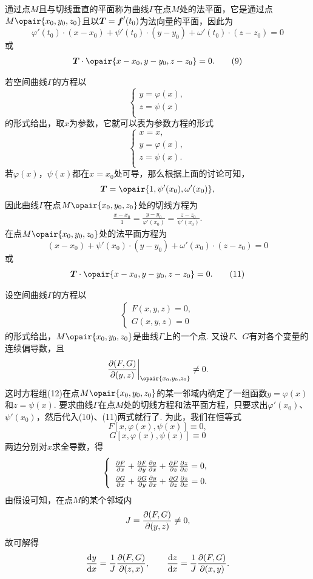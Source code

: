 通过点\(M\)且与切线垂直的平面称为曲线\(\Gamma\)在点\(M\)处的法平面，它是通过点\(M\opair{x_0,y_0,z_0}\)且以\(\boldsymbol{T}=\boldsymbol{f}'(t_0)\)为法向量的平面，因此为\[
\varphi'(t_0) \cdot (x-x_0) + \psi'(t_0) \cdot (y-y_0) + \omega'(t_0) \cdot (z-z_0) = 0
\]或\begin{gather}
\mat{T}\cdot\opair{x-x_0,y-y_0,z-z_0}=0.
\tag9
\end{gather}

若空间曲线\(\Gamma\)的方程以\[
\left\{ \begin{array}{l}
y = \varphi(x), \\
z = \psi(x) \\
\end{array} \right.
\]的形式给出，取\(x\)为参数，它就可以表为参数方程的形式\[
\left\{ \begin{array}{l}
x = x, \\
y = \varphi(x), \\
z = \psi(x). \\
\end{array} \right.
\]若\(\varphi(x)\)，\(\psi(x)\)都在\(x=x_0\)处可导，那么根据上面的讨论可知，\[
\mat{T} = \opair{1,\psi'(x_0),\omega'(x_0)},
\]因此曲线\(\Gamma\)在点\(M\opair{x_0,y_0,z_0}\)处的切线方程为\begin{gather}
\frac{x-x_0}{1}
=\frac{y-y_0}{\varphi'(x_0)}
=\frac{z-z_0}{\psi'(x_0)}.
\tag{10}
\end{gather}在点\(M\opair{x_0,y_0,z_0}\)处的法平面方程为\[
(x-x_0) + \psi'(x_0) \cdot (y-y_0) + \omega'(x_0) \cdot (z-z_0) = 0
\]或\begin{gather}
\mat{T}\cdot\opair{x-x_0,y-y_0,z-z_0}=0.
\tag{11}
\end{gather}

设空间曲线\(\Gamma\)的方程以\begin{gather}
\left\{ \begin{array}{l}
F(x,y,z)=0, \\
G(x,y,z)=0
\end{array} \right.
\tag{12}
\end{gather}的形式给出，\(M\opair{x_0,y_0,z_0}\)是曲线\(\Gamma\)上的一个点.
又设\(F\)、\(G\)有对各个变量的连续偏导数，且\[
\eval{\jacobi{F,G}{y,z}}_{\opair{x_0,y_0,z_0}} \neq 0.
\]这时方程组(12)在点\(M\opair{x_0,y_0,z_0}\)的某一邻域内确定了一组函数\(y=\varphi(x)\)和\(z=\psi(x)\).
要求曲线\(\Gamma\)在点\(M\)处的切线方程和法平面方程，只要求出\(\varphi'(x_0)\)、\(\psi'(x_0)\)，然后代入(10)、(11)两式就行了.
为此，我们在恒等式\[
F[x,\varphi(x),\psi(x)] \equiv 0,
\]\[
G[x,\varphi(x),\psi(x)] \equiv 0
\]两边分别对\(x\)求全导数，得\[
\def\arraystretch{1.5}
\left\{ \begin{array}{l}
\pdv{F}{x} + \pdv{F}{y} \pdv{y}{x} + \pdv{F}{z} \pdv{z}{x} = 0, \\
\pdv{G}{x} + \pdv{G}{y} \pdv{y}{x} + \pdv{G}{z} \pdv{z}{x} = 0.
\end{array} \right.
\]由假设可知，在点\(M\)的某个邻域内\[
J = \pdv{ (F,G) }{ (y,z) } \neq 0,
\]故可解得\[
\dv{y}{x} = \frac{1}{J} \pdv{ (F,G) }{ (z,x) },
\qquad
\dv{z}{x} = \frac{1}{J} \pdv{ (F,G) }{ (x,y) }.
\]


